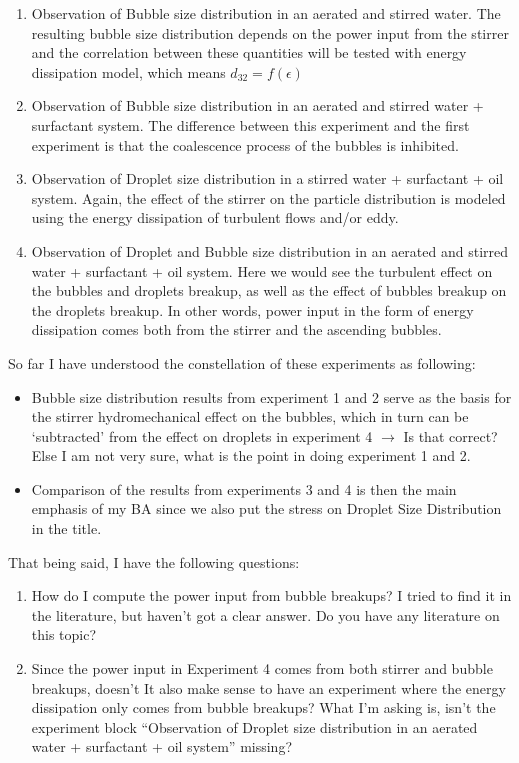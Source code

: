 \begin{enumerate}
    \item Observation of Bubble size distribution in an aerated and stirred water. The resulting bubble size distribution depends on the power input from the stirrer and the correlation between these quantities will be tested with energy dissipation model, which means $d_{32} = f \left( \epsilon \right)$
	\item Observation of Bubble size distribution in an aerated and stirred water + surfactant system. The difference between this experiment and the first experiment is that the coalescence process of the bubbles is inhibited.
	\item Observation of Droplet size distribution in a stirred water + surfactant + oil system. Again, the effect of the stirrer on the particle distribution is modeled using the energy dissipation of turbulent flows and/or eddy.
	\item Observation of Droplet and Bubble size distribution in an aerated and stirred water + surfactant + oil system. Here we would see the turbulent effect on the bubbles and droplets breakup, as well as the effect of bubbles breakup on the droplets breakup. In other words, power input in the form of energy dissipation comes both from the stirrer and the ascending bubbles.
\end{enumerate}

So far I have understood the constellation of these experiments as following:
\begin{itemize}
    \item Bubble size distribution results from experiment 1 and 2 serve as the basis for the stirrer hydromechanical effect on the bubbles, which in turn can be ‘subtracted’ from the effect on droplets in experiment 4 $\rightarrow$ Is that correct? Else I am not very sure, what is the point in doing experiment 1 and 2.
	\item Comparison of the results from experiments 3 and 4 is then the main emphasis of my BA since we also put the stress on Droplet Size Distribution in the title.
\end{itemize}

That being said, I have the following questions:
\begin{enumerate}
    \item How do I compute the power input from bubble breakups? I tried to find it in the literature, but haven’t got a clear answer. Do you have any literature on this topic?
	\item Since the power input in Experiment 4 comes from both stirrer and bubble breakups, doesn’t It also make sense to have an experiment where the energy dissipation only comes from bubble breakups? What I’m asking is, isn’t the experiment block “Observation of Droplet size distribution in an aerated water + surfactant + oil system” missing?
\end{enumerate}